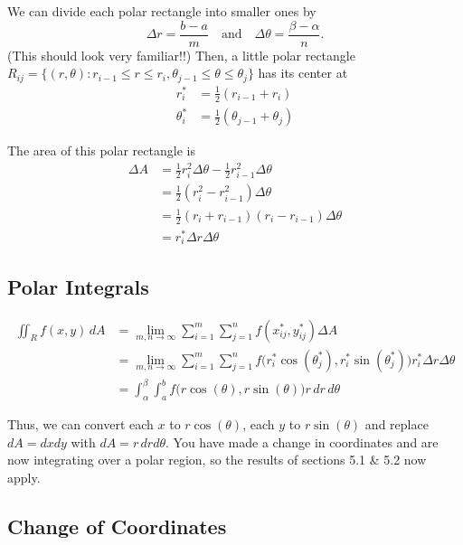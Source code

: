 We can divide each polar rectangle into smaller ones by
\[
  \Delta r = \frac{b-a}{m} \quad \text{and} \quad \Delta \theta = \frac{\beta-\alpha}{n}.
\]
(This should look very familiar!!) Then, a little polar rectangle \(R_{ij} = \{(r, \theta) : r_{i-1} \leq r \leq r_i, \theta_{j-1} \leq \theta \leq \theta_j\}\) has its center at
\begin{align*}
  r^*_i & = \frac{1}{2}(r_{i-1} + r_i) \\
  \theta^*_i & = \frac{1}{2}(\theta_{j-1} + \theta_j)
\end{align*}

The area of this polar rectangle is
\begin{align*}
  \Delta A & = \frac{1}{2}r_i^2 \Delta \theta - \frac{1}{2}r_{i-1}^2 \Delta \theta \\
           & = \frac{1}{2}\left(r_i^2 - r_{i-1}^2\right) \Delta \theta \\
           & = \frac{1}{2}(r_i + r_{i-1})(r_i - r_{i-1}) \Delta \theta \\
           & = r^*_i \Delta r \Delta \theta
\end{align*}

\subsection{Polar Integrals}

\begin{align*}
  \iint_{R}f(x,y) \, dA & = \lim_{m,n \to \infty} \sum_{i=1}^{m} \sum_{j=1}^{n} f(x^*_{ij}, y^*_{ij}) \Delta A \\
                        & = \lim_{m,n \to \infty} \sum_{i=1}^{m} \sum_{j=1}^{n} f\bigl(r^*_i \cos\left(\theta^*_j\right), r^*_i \sin\left(\theta^*_j\right)\bigr) r^*_i \Delta r \Delta \theta \\
                        & = \int_{\alpha}^{\beta} \int_{a}^{b} f\bigl(r \cos(\theta), r \sin(\theta) \bigr) r \, dr \, d\theta
\end{align*}

Thus, we can convert each \(x\) to \(r \cos(\theta)\), each \(y\) to \(r \sin(\theta)\) and replace \(dA = dxdy\) with \(dA = r \, dr d\theta\). You have made a change in coordinates and are now integrating over a polar region, so the results of sections 5.1 \& 5.2 now apply.

\subsection{Change of Coordinates}

